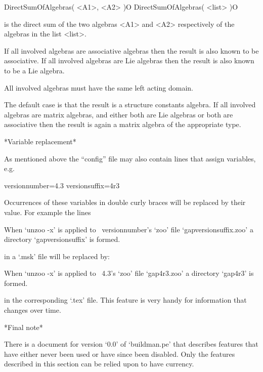 \){\fmark}DirectSumOfAlgebras( <A1>, <A2> )\hfill O
\){\fmark}DirectSumOfAlgebras( <list> )\hfill O

is the direct sum of the two algebras <A1> and <A2> respectively of the
algebras in the list <list>.

If all involved algebras are associative algebras then the result is also
known to be associative.
If all involved algebras are Lie algebras then the result is also known
to be a Lie algebra.

All involved algebras must have the same left acting domain.

The default case is that the result is a structure constants algebra.
If all involved algebras are matrix algebras, and either both are Lie
algebras or both are associative then the result is again a
matrix algebra of the appropriate type.

*Variable replacement*

As mentioned above the ``config'' file may also contain lines that assign
variables, e.g.

\begintt
versionnumber=4.3
versionsuffix=4r3
\endtt

Occurrences of these variables in double curly braces will be replaced by
their value. For example the lines

\begintt
When `unzoo -x' is applied to {\GAP}~{{versionnumber}}'s `zoo' file
`gap{{versionsuffix}}.zoo' a directory `gap{{versionsuffix}}' is formed.
\endtt

in a `.msk' file will be replaced by:

\begintt
When `unzoo -x' is applied to {\GAP}~4.3's `zoo' file
`gap4r3.zoo' a directory `gap4r3' is formed.
\endtt

in the corresponding `.tex' file.
This feature is very handy for information that changes over time.

*Final note*

There is a document for version `0.0'  of  `buildman.pe'  that  describes
features that have either never been used or have  since  been  disabled.
Only the features described in this section can be relied  upon  to  have
currency.

\EndOfBook

